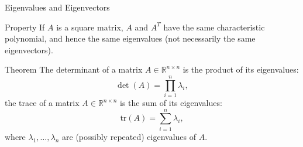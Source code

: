 \documentclass{beamer}
\newcommand{\R}{\mathbb{R}}
\begin{document}




\begin{frame}{Eigenvalues and Eigenvectors}
\begin{block}{Property}
    If $A$ is a square matrix, $A$ and $A^{T}$ have the same characteristic polynomial, and hence the same eigenvalues (not necessarily the same eigenvectors).
\end{block}
\pause
\begin{block}{Theorem}
    The determinant of a matrix \(A \in \mathbb{R}^{n \times n}\) is the product of its eigenvalues:
\[
\det(A) = \prod_{i=1}^{n} \lambda_i,
\]
the trace of a matrix \(A \in \mathbb{R}^{n \times n}\) is the sum of its eigenvalues:
\[
\text{tr}(A) = \sum_{i=1}^{n} \lambda_i,
\]
where \(\lambda_1,\dots,\lambda_n\) are (possibly repeated) eigenvalues of \(A\).\end{block}
\end{frame}
\end{document}
